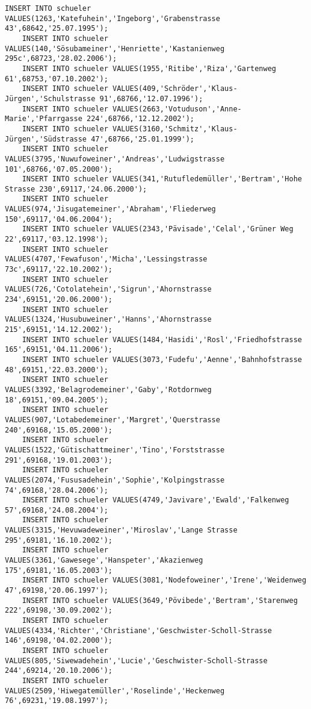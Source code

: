 \begin{lstlisting}[breaklines=True, numbers=none, basicstyle=\tiny, keepspaces=false]
	INSERT INTO schueler VALUES(1263,'Katefuhein','Ingeborg','Grabenstrasse 43',68642,'25.07.1995');
	INSERT INTO schueler VALUES(140,'Sösubameiner','Henriette','Kastanienweg 295c',68723,'28.02.2006');
	INSERT INTO schueler VALUES(1955,'Ritibe','Riza','Gartenweg 61',68753,'07.10.2002');
	INSERT INTO schueler VALUES(409,'Schröder','Klaus-Jürgen','Schulstrasse 91',68766,'12.07.1996');
	INSERT INTO schueler VALUES(2663,'Votuduson','Anne-Marie','Pfarrgasse 224',68766,'12.12.2002');
	INSERT INTO schueler VALUES(3160,'Schmitz','Klaus-Jürgen','Südstrasse 47',68766,'25.01.1999');
	INSERT INTO schueler VALUES(3795,'Nuwufoweiner','Andreas','Ludwigstrasse 101',68766,'07.05.2000');
	INSERT INTO schueler VALUES(341,'Rutufledemüller','Bertram','Hohe Strasse 230',69117,'24.06.2000');
	INSERT INTO schueler VALUES(974,'Jisugatemeiner','Abraham','Fliederweg 150',69117,'04.06.2004');
	INSERT INTO schueler VALUES(2343,'Pävisade','Celal','Grüner Weg 22',69117,'03.12.1998');
	INSERT INTO schueler VALUES(4707,'Fewafuson','Micha','Lessingstrasse 73c',69117,'22.10.2002');
	INSERT INTO schueler VALUES(726,'Cotolatehein','Sigrun','Ahornstrasse 234',69151,'20.06.2000');
	INSERT INTO schueler VALUES(1324,'Husubuweiner','Hanns','Ahornstrasse 215',69151,'14.12.2002');
	INSERT INTO schueler VALUES(1484,'Hasidi','Rosl','Friedhofstrasse 165',69151,'04.11.2006');
	INSERT INTO schueler VALUES(3073,'Fudefu','Aenne','Bahnhofstrasse 48',69151,'22.03.2000');
	INSERT INTO schueler VALUES(3392,'Belagrodemeiner','Gaby','Rotdornweg 18',69151,'09.04.2005');
	INSERT INTO schueler VALUES(907,'Lotabedemeiner','Margret','Querstrasse 240',69168,'15.05.2000');
	INSERT INTO schueler VALUES(1522,'Gütischattmeiner','Tino','Forststrasse 291',69168,'19.01.2003');
	INSERT INTO schueler VALUES(2074,'Fususadehein','Sophie','Kolpingstrasse 74',69168,'28.04.2006');
	INSERT INTO schueler VALUES(4749,'Javivare','Ewald','Falkenweg 57',69168,'24.08.2004');
	INSERT INTO schueler VALUES(3315,'Hevuwadeweiner','Miroslav','Lange Strasse 295',69181,'16.10.2002');
	INSERT INTO schueler VALUES(3361,'Gawesege','Hanspeter','Akazienweg 175',69181,'16.05.2003');
	INSERT INTO schueler VALUES(3081,'Nodefoweiner','Irene','Weidenweg 47',69198,'20.06.1997');
	INSERT INTO schueler VALUES(3649,'Pövibede','Bertram','Starenweg 222',69198,'30.09.2002');
	INSERT INTO schueler VALUES(4334,'Richter','Christiane','Geschwister-Scholl-Strasse 146',69198,'04.02.2000');
	INSERT INTO schueler VALUES(805,'Siwewadehein','Lucie','Geschwister-Scholl-Strasse 244',69214,'20.10.2006');
	INSERT INTO schueler VALUES(2509,'Hiwegatemüller','Roselinde','Heckenweg 76',69231,'19.08.1997');

\end{lstlisting}
